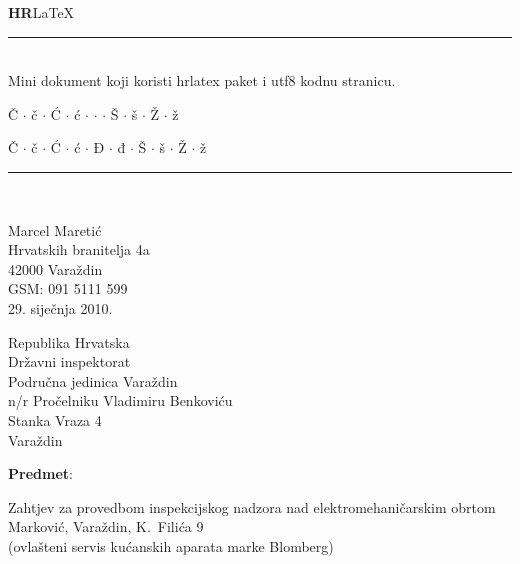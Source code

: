 \documentclass[12pt]{minimal}
\begin{document}
\noindent 	
\fontsize{20pt}{10pt}%
\selectfont%
\textsf{\textbf{\textsf{HR}}LaTeX} \\
\rule{\textwidth}{1pt}\\
\normalsize
Mini dokument koji koristi \textsf{hrlatex} paket i \textsf{utf8} kodnu stranicu.\\

\medskip

\noindent
% 
\fontsize{20pt}{25pt}%
\selectfont%
%  
\strut\hfil \v{C} $\cdot$ \v{c} $\cdot$ {\'{C}} $\cdot$ {\'{c}} $\cdot$ \DJ{} $\cdot$ \dj{} $\cdot$ \v{S} $\cdot$ \v{s} $\cdot$ \v{Z} $\cdot$ \v{z}\\
% 	
\strut\hfil Č  $\cdot$    č  $\cdot$   Ć  $\cdot$   ć  $\cdot$   Đ  $\cdot$    đ  $\cdot$   Š  $\cdot$   š  $\cdot$   Ž  $\cdot$  ž\\
\rule{\textwidth}{1pt}\\
\vfill

\newpage
\normalsize
\fontsize{12pt}{15pt}%
\selectfont%

\noindent 
Marcel Maretić \\
Hrvatskih branitelja 4a\\
42000 Varaždin\\[0.5ex]
GSM: 091 5111 599 \\[0.5ex]
29. siječnja 2010.

\strut\hfill
\begin{minipage}[t]{7cm}
        Republika Hrvatska\\
        Državni inspektorat\\
        Područna jedinica Varaždin  \\
        n/r Pročelniku Vladimiru Benkoviću\\
        Stanka Vraza 4\\
        Varaždin
\end{minipage}



\vspace*{2cm}

\textbf{Predmet}:
\begin{minipage}[t]{12cm}
\raggedright
 Zahtjev za provedbom inspekcijskog nadzora nad elektromehaničarskim obrtom Marković, Varaždin, K.~Filića 9 \\
(ovlašteni servis kućanskih aparata marke Blomberg)     
\end{minipage}

\vspace*{2cm}
\end{document}
